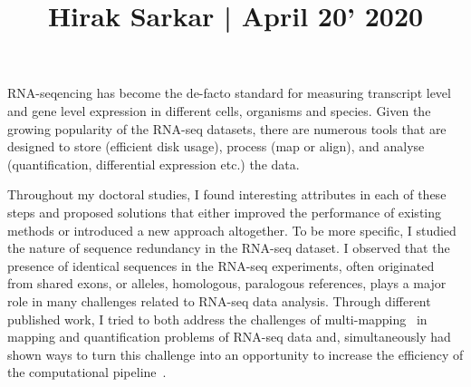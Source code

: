 \documentclass[11pt,a4paper,sans]{moderncv}        %
\title{Hirak Sarkar | April 20' 2020}
\begin{document}
\makecvtitle


\setlength{\parindent}{5ex}
RNA-seqencing has become the de-facto standard for measuring transcript level and gene level expression in different cells, organisms and species. Given the growing popularity of the RNA-seq datasets, there are numerous tools that are designed to store (efficient disk usage), process (map or align), and analyse (quantification, differential expression etc.) the data.

\setlength{\parindent}{5ex}
Throughout my doctoral studies, I found interesting attributes in each of these steps and proposed solutions that either improved the performance of existing methods or introduced a new approach altogether. To be more specific, I studied the nature of sequence redundancy in the RNA-seq dataset. I observed that the presence of identical sequences in the RNA-seq experiments, often originated from shared exons, or alleles, homologous, paralogous references, plays a major role in many challenges related to RNA-seq data analysis. Through different published work, I tried to both address the challenges of multi-mapping~\cite{quark,pufferfish,selaln} in mapping and quantification problems of RNA-seq data and, simultaneously had shown ways to turn this challenge into an opportunity to increase the efficiency of the computational pipeline~\cite{terminus,rapclust}.
\end{document}
